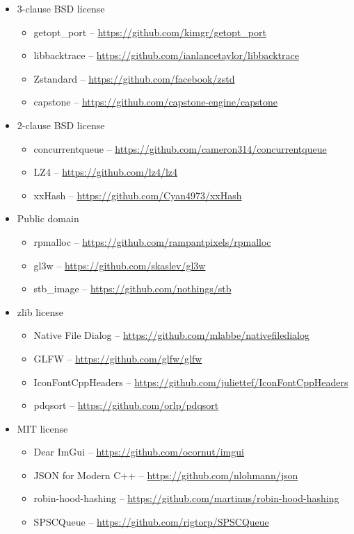 \documentclass[hidelinks,titlepage,a4paper]{article}
\begin{document}
\begin{itemize}
\item 3-clause BSD license
\begin{itemize}
\item getopt\_port -- \url{https://github.com/kimgr/getopt\_port}
\item libbacktrace \faStar{} -- \url{https://github.com/ianlancetaylor/libbacktrace}
\item Zstandard -- \url{https://github.com/facebook/zstd}
\item capstone -- \url{https://github.com/capstone-engine/capstone}
\end{itemize}

\item 2-clause BSD license
\begin{itemize}
\item concurrentqueue \faStar{} -- \url{https://github.com/cameron314/concurrentqueue}
\item LZ4 \faStar{} -- \url{https://github.com/lz4/lz4}
\item xxHash -- \url{https://github.com/Cyan4973/xxHash}
\end{itemize}

\item Public domain
\begin{itemize}
\item rpmalloc \faStar{} -- \url{https://github.com/rampantpixels/rpmalloc}
\item gl3w -- \url{https://github.com/skaslev/gl3w}
\item stb\_image -- \url{https://github.com/nothings/stb}
\end{itemize}

\item zlib license
\begin{itemize}
\item Native File Dialog -- \url{https://github.com/mlabbe/nativefiledialog}
\item GLFW -- \url{https://github.com/glfw/glfw}
\item IconFontCppHeaders -- \url{https://github.com/juliettef/IconFontCppHeaders}
\item pdqsort -- \url{https://github.com/orlp/pdqsort}
\end{itemize}

\item MIT license
\begin{itemize}
\item Dear ImGui -- \url{https://github.com/ocornut/imgui}
\item JSON for Modern C++ -- \url{https://github.com/nlohmann/json}
\item robin-hood-hashing -- \url{https://github.com/martinus/robin-hood-hashing}
\item SPSCQueue \faStar{} -- \url{https://github.com/rigtorp/SPSCQueue}
\end{itemize}


\end{itemize}
\end{document}
